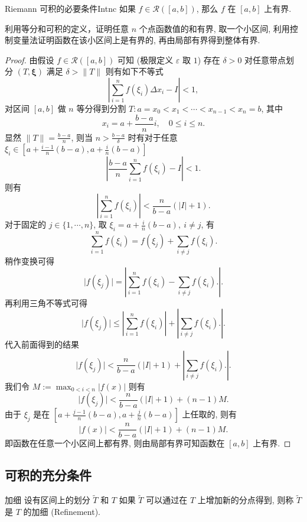 \documentclass[cn,toc=twocol]{elegantbook}
\newcommand{\ve}[1]{\boldsymbol{#1}}
\newcommand{\ds}{\displaystyle}
\begin{document}
\begin{theorem}{Riemann 可积的必要条件}{Intnc}
	如果 $f \in \mathscr{R}([a,b])$, 那么 $f$ 在 $[a,b]$ 上有界.	
\end{theorem}

\begin{idea*}
利用等分和可积的定义，证明任意 $n$ 个点函数值的和有界, 取一个小区间, 利用控制变量法证明函数在该小区间上是有界的, 再由局部有界得到整体有界.
\end{idea*}


\begin{proof}
	由假设 $f \in \mathscr{R}([a,b])$ 可知 (极限定义 $\varepsilon$ 取 $1$) 存在 $\delta > 0$ 对任意带点划分 $(T,\ve\xi)$ 满足 $\delta > \lVert T \rVert$ 则有如下不等式
	\[
		\left\lvert \sum_{i=1}^n f(\xi_i)\Delta x_i - I\right\rvert < 1,
	\]
	 对区间 $[a,b]$ 做 $n$ 等分得到分割 $T : a = x_0 < x_1 < \cdots < x_{n-1} < x_n = b$, 其中
\[
	x_i = a + \frac{b-a}{n} i,\quad 0 \le i \le n.
\]
显然 $\ds \lVert T \rVert = \frac{b - a}{n}$, 则当 $n > \frac{b - a}{\delta}$ 时有对于任意 $\ds\xi_i \in \left[a + \frac{i-1}{n}(b-a),a + \frac{i}{n}(b-a)\right]$
\[
	\left\lvert \frac{b - a}{n}  \sum_{i=1}^n f(\xi_i) - I\right\rvert < 1.
\]
则有
\[
	\left\lvert \sum_{i=1}^n f(\xi_i)\right\rvert <  \frac{n}{b - a}(\lvert I \rvert + 1).
\]
对于固定的 $j \in \{1,\cdots, n\}$, 取 $\xi_i = a + \frac{i}{n}(b-a),\ i \neq j$, 有
\[
	\sum_{i=1}^n f(\xi_i) = f(\xi_j) + \sum_{i\neq j} f(\xi_i).
\]
稍作变换可得
\[
	\vert f(\xi_j) \rvert = \left\lvert \sum_{i=1}^n f(\xi_i) - \sum_{i\neq j} f(\xi_i). \right\rvert.
\]
再利用三角不等式可得
\[
	\vert f(\xi_j) \rvert \le \left\lvert \sum_{i=1}^n f(\xi_i)\right\rvert + \left\lvert\sum_{i\neq j} f(\xi_i). \right\rvert.
\]
代入前面得到的结果
\[
	\vert f(\xi_j) \rvert < \frac{n}{b - a}(\lvert I \rvert + 1) + \left\lvert\sum_{i\neq j} f(\xi_i). \right\rvert.
\]
我们令 $\ds M := \max_{0 < i < n} \lvert f(x)\rvert$ 则有
\[
	\vert f(\xi_j) \rvert < \frac{n}{b - a}(\lvert I \rvert + 1) + (n-1) M.
\]
由于 $\xi_j$ 是在 $\left[a + \frac{j-1}{n}(b-a),a+ \frac{j}{n}(b - a)\right]$ 上任取的, 则有
\[
	\vert f(x) \rvert < \frac{n}{b - a}(\lvert I \rvert + 1) + (n-1) M.
\]
即函数在任意一个小区间上都有界, 则由局部有界可知函数在 $[a,b]$ 上有界.
\end{proof}


\subsection{可积的充分条件}

\begin{definition}{加细}
	设有区间上的划分 $\widetilde T$ 和 $T$ 如果 $\widetilde T$ 可以通过在 $T$ 上增加新的分点得到, 则称 $\widetilde T$ 是 $T$ 的加细 (Refinement).
\end{definition}
\end{document}
